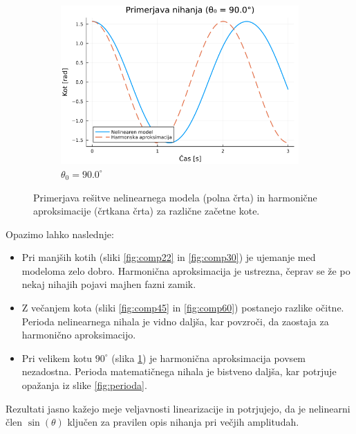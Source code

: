 \documentclass{article}
\begin{document}
\begin{figure}[h!]
    \begin{subfigure}[b]{0.49\textwidth}
        \includegraphics[width=\textwidth]{../slike/primerjava_1.57.png}
        \caption{$\theta_0 = 90.0^\circ$}
        \label{fig:comp90}
    \end{subfigure}
    
    \caption{Primerjava rešitve nelinearnega modela (polna črta) in harmonične aproksimacije (črtkana črta) 
    za različne začetne kote.}
    \label{fig:primerjave}
\end{figure}

Opazimo lahko naslednje:
\begin{itemize}
    \item Pri manjših kotih (sliki \ref{fig:comp22} in \ref{fig:comp30}) je ujemanje med modeloma zelo dobro. 
    Harmonična aproksimacija je ustrezna, čeprav se že po nekaj nihajih pojavi majhen fazni zamik.
    \item Z večanjem kota (sliki \ref{fig:comp45} in \ref{fig:comp60}) postanejo razlike očitne. Perioda 
    nelinearnega nihala je vidno daljša, kar povzroči, da zaostaja za harmonično aproksimacijo.
    \item Pri velikem kotu $90^\circ$ (slika \ref{fig:comp90}) je harmonična aproksimacija povsem nezadostna. 
    Perioda matematičnega nihala je bistveno daljša, kar potrjuje opažanja iz slike \ref{fig:perioda}.
\end{itemize}
Rezultati jasno kažejo meje veljavnosti linearizacije in potrjujejo, da je nelinearni člen $\sin(\theta)$ 
ključen za pravilen opis nihanja pri večjih amplitudah.
\end{document}
